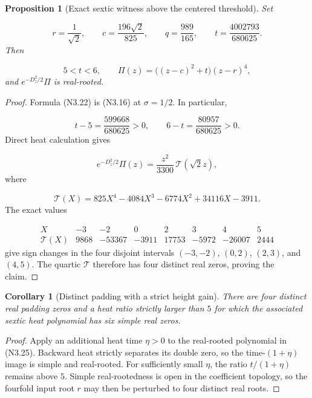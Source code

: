 \documentclass[11pt]{article}
\newtheorem{proposition}[theorem]{Proposition}
\newtheorem{corollary}[theorem]{Corollary}
\theoremstyle{definition}
\theoremstyle{remark}
\begin{document}
\begin{proposition}[Exact sextic witness above the centered threshold]
\label{prop:f2v3-witness}
Set

\[
 r=\frac1{\sqrt2},\qquad
 c=\frac{196\sqrt2}{825},\qquad
 q=\frac{989}{165},\qquad
 t=\frac{4002793}{680625}.
 \tag{N3.22}
\]
Then

\[
 5<t<6,
 \qquad
 \Pi(z)=\bigl((z-c)^2+t\bigr)(z-r)^4,
 \tag{N3.23}
\]
and \(e^{-D_z^2/2}\Pi\) is real-rooted.
\end{proposition}

\begin{proof}
Formula \textup{(N3.22)} is \textup{(N3.16)} at
\(\sigma=1/2\).  In particular,

\[
 t-5=\frac{599668}{680625}>0,
 \qquad
 6-t=\frac{80957}{680625}>0.
 \tag{N3.24}
\]
Direct heat calculation gives

\[
 e^{-D_z^2/2}\Pi(z)
 =\frac{z^2}{3300}\,
 \mathcal T(\sqrt2z),
 \tag{N3.25}
\]
where

\[
 \mathcal T(X)=825X^4-4084X^3-6774X^2+34116X-3911.
 \tag{N3.26}
\]
The exact values

\[
\begin{array}{c|rrrrrrr}
X&-3&-2&0&2&3&4&5\\ \hline
\mathcal T(X)&9868&-53367&-3911&17753&-5972&-26007&2444
\end{array}
\tag{N3.27}
\]
give sign changes in the four disjoint intervals
\((-3,-2)\), \((0,2)\), \((2,3)\), and \((4,5)\).  The quartic
\(\mathcal T\) therefore has four distinct real zeros, proving the
claim.
\end{proof}

\begin{corollary}[Distinct padding with a strict height gain]
\label{cor:f2v3-distinct}
There are four distinct real padding zeros and a heat ratio strictly
larger than \(5\) for which the associated sextic heat polynomial has
six simple real zeros.
\end{corollary}

\begin{proof}
Apply an additional heat time \(\eta>0\) to the real-rooted polynomial
in \textup{(N3.25)}.  Backward heat strictly separates its double zero,
so the time-\((1+\eta)\) image is simple and real-rooted.  For sufficiently
small \(\eta\), the ratio \(t/(1+\eta)\) remains above \(5\).  Simple
real-rootedness is open in the coefficient topology, so the fourfold
input root \(r\) may then be perturbed to four distinct real roots.
\end{proof}
\end{document}
